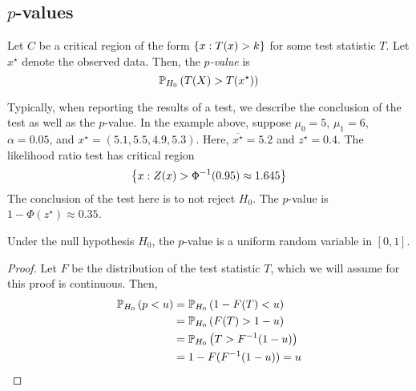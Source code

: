 \subsection{\( p \)-values}
\begin{definition}
	Let \( C \) be a critical region of the form \( \qty{ x: T(x) > k } \) for some test statistic \( T \).
	Let \( x^\star \) denote the observed data.
	Then, the \textit{\( p \)-value} is
	\[ \mathbb{P}_{H_0}\left({T(X) > T(x^\star)}\right) \]
\end{definition}
Typically, when reporting the results of a test, we describe the conclusion of the test as well as the \( p \)-value.
In the example above, suppose \( \mu_0 = 5 \), \( \mu_1 = 6 \), \( \alpha = 0.05 \), and \( x^\star = (5.1, 5.5, 4.9, 5.3) \).
Here, \( \overline{x^\star} = 5.2 \) and \( z^\star = 0.4 \).
The likelihood ratio test has critical region
\[ \qty{x: Z(x) > \Phi^{-1}(0.95) \approx 1.645} \]
The conclusion of the test here is to not reject \( H_0 \).
The \( p \)-value is \( 1 - \Phi(z^\star) \approx 0.35 \).
\begin{proposition}
	Under the null hypothesis \( H_0 \), the \( p \)-value is a uniform random variable in \( [0,1] \).
\end{proposition}
\begin{proof}
	Let \( F \) be the distribution of the test statistic \( T \), which we will assume for this proof is continuous.
	Then,
	\begin{align*}
		\mathbb{P}_{H_0}\left({p < u}\right) &= \mathbb{P}_{H_0}\left({1 - F(T) < u}\right) \\
		&= \mathbb{P}_{H_0}\left({F(T) > 1-u}\right) \\
		&= \mathbb{P}_{H_0}\left({T > F^{-1}(1-u)}\right) \\
		&= 1 - F(F^{-1}(1-u)) = u
	\end{align*}
\end{proof}

